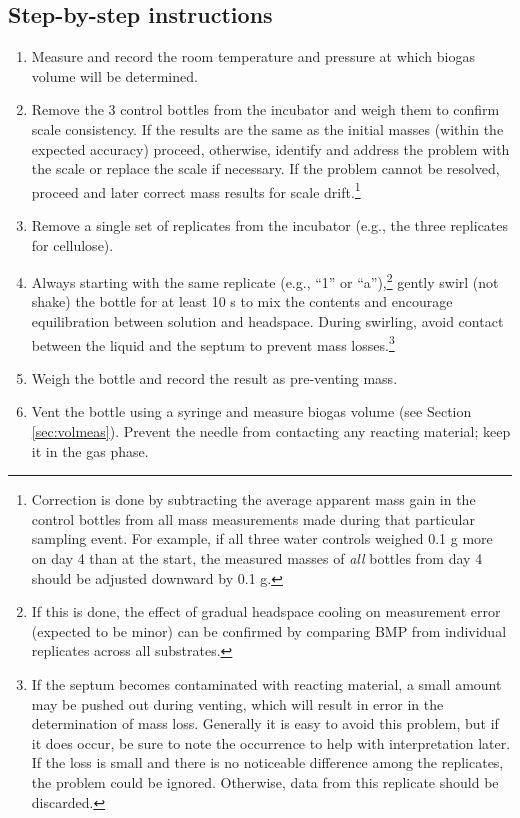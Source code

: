 \documentclass[]{article}
\begin{document}
\subsection{Step-by-step instructions} 
\label{sec:steps}
\begin{enumerate}
    \item Measure and record the room temperature and pressure at which biogas volume will be determined.
    \item Remove the 3 control bottles from the incubator and weigh them to confirm scale consistency. 
      If the results are the same as the initial masses (within the expected accuracy) proceed, otherwise, identify and address the problem with the scale or replace the scale if necessary.
      If the problem cannot be resolved, proceed and later correct mass results for scale drift.\footnote{
        Correction is done by subtracting the average apparent mass gain in the control bottles from all mass measurements made during that particular sampling event. 
        For example, if all three water controls weighed 0.1 g more on day 4 than at the start, the measured masses of \textit{all} bottles from day 4 should be adjusted downward by 0.1 g.
      }
    \item Remove a single set of replicates from the incubator (e.g., the three replicates for cellulose).
    \item Always starting with the same replicate (e.g., ``1'' or ``a''),\footnote{
        If this is done, the effect of gradual headspace cooling on measurement error (expected to be minor) can be confirmed by comparing BMP from individual replicates across all substrates.
      } gently swirl (not shake) the bottle for at least 10 s to mix the contents and encourage  equilibration between solution and headspace. 
      During swirling, avoid contact between the liquid and the septum to prevent mass losses.\footnote{
        If the septum becomes contaminated with reacting material, a small amount may be pushed out during venting, which will result in error in the determination of mass loss.
        Generally it is easy to avoid this problem, but if it does occur, be sure to note the occurrence to help with interpretation later.
        If the loss is small and there is no noticeable difference among the replicates, the problem could be ignored. 
        Otherwise, data from this replicate should be discarded.
      }
    \item Weigh the bottle and record the result as pre-venting mass.
    \item Vent the bottle using a syringe and measure biogas volume (see Section \ref{sec:volmeas}). Prevent the needle from contacting any reacting material; keep it in the gas phase. 

\end{enumerate}
\end{document}
